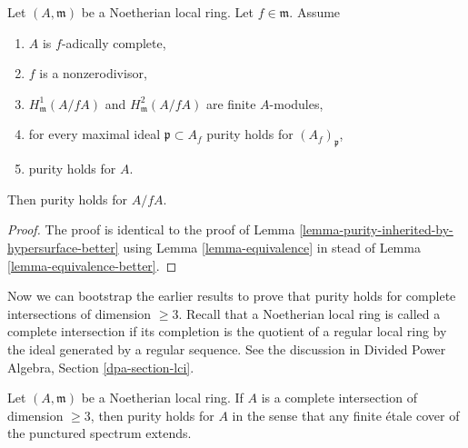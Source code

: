 \begin{lemma}
\label{lemma-purity-inherited-by-hypersurface}
Let $(A, \mathfrak m)$ be a Noetherian local ring.
Let $f \in \mathfrak m$. Assume
\begin{enumerate}
\item $A$ is $f$-adically complete,
\item $f$ is a nonzerodivisor,
\item $H^1_\mathfrak m(A/fA)$ and $H^2_\mathfrak m(A/fA)$ are finite
$A$-modules,
\item for every maximal ideal $\mathfrak p \subset A_f$
purity holds for $(A_f)_\mathfrak p$,
\item purity holds for $A$.
\end{enumerate}
Then purity holds for $A/fA$.
\end{lemma}

\begin{proof}
The proof is identical to the proof of
Lemma \ref{lemma-purity-inherited-by-hypersurface-better}
using
Lemma \ref{lemma-equivalence}
in stead of
Lemma \ref{lemma-equivalence-better}.
\end{proof}

\noindent
Now we can bootstrap the earlier results to prove that
purity holds for complete intersections of dimension $\geq 3$.
Recall that a Noetherian local ring is called a complete
intersection if its completion is the quotient of a
regular local ring by the ideal generated by a regular sequence.
See the discussion in Divided Power Algebra, Section \ref{dpa-section-lci}.

\begin{proposition}
\label{proposition-purity-complete-intersection}
Let $(A, \mathfrak m)$ be a Noetherian local ring. If $A$ is a
complete intersection of dimension $\geq 3$, then purity
holds for $A$ in the sense that any finite \'etale cover of
the punctured spectrum extends.
\end{proposition}

